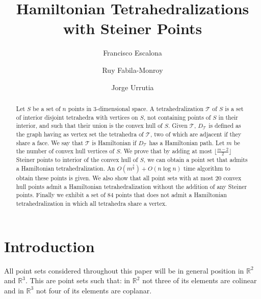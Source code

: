 \documentclass{article}
\title{Hamiltonian Tetrahedralizations with Steiner Points}
\author{
Francisco Escalona\footnotemark[1] \and
Ruy Fabila-Monroy\footnotemark[2] \and
Jorge Urrutia  \footnotemark[2]
}
\begin{document}
\maketitle

\begin{abstract}

Let $S$ be a set of $n$ points in $3$-dimensional 
space. A tetrahedralization 
$\mathcal{T}$ of $S$ is a set of interior 
disjoint tetrahedra with vertices on $S$, 
not containing points of $S$ in their interior, 
and such that their union is the convex hull of $S$.
Given $\mathcal{T}$, $D_\mathcal{T}$ is
defined as the graph having as vertex set
the tetrahedra of $\mathcal{T}$, two of which are adjacent
if they share a face. We say that $\mathcal{T}$ 
is Hamiltonian if  $D_\mathcal{T}$ has
a  Hamiltonian path. Let $m$ be the number
of convex hull vertices of $S$.
We prove that by adding
at most $\lfloor \frac{m-2}{2} \rfloor$ 
Steiner points to interior of the convex hull of $S$, 
we can obtain a point
set that admits a Hamiltonian tetrahedralization.
An $O(m^\frac{3}{2}) +  O(n \log n)$  time
algorithm to obtain these points is given.
We also show that all point sets with at most $20$
convex hull points admit a Hamiltonian tetrahedralization
without the addition of any Steiner points.
Finally we exhibit a set of $84$ points that does not
admit a Hamiltonian tetrahedralization in which all
tetrahedra share a vertex.
\end{abstract}




\renewcommand{\thefootnote}{\fnsymbol{footnote}}


\renewcommand{\thefootnote}{\arabic{footnote}}

\section{Introduction}

All point sets considered throughout this paper will be in general position
in $\mathbb{R}^2$ and $\mathbb{R}^3$.
This are point sets such that: in $\mathbb{R}^2$ not three
of its elements are colinear and in $\mathbb{R}^3$ not
four of its elements are coplanar.\par
\end{document}
